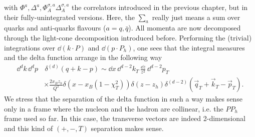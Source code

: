 with $\Phi^a, \Delta^a,\Phi_A^{\sigma,a}\Delta_A^{\sigma,a}$ the correlators introduced in the previous chapter, but in their fully-unintegrated versions. Here, the $\sum_a$ really just means a sum over quarks and anti-quarks flavours ($a=q,\bar{q}$). All momenta are now decomposed through the light-cone decomposition introduced before. Performing the (trivial) integrations over $\dd (k \cdot P)$ and $\dd (p\cdot P_h)$, one sees that the integral measures and the delta function arrange in the following way
\begin{equation}
    \begin{aligned}
        \dd^d k \,\dd^d p &\,\delta^{(d)}(q+k-p) \sim\dd x\, \dd^{d-2}k_T\, \frac{\dd z}{z^2}\, \dd^{d-2}p_T\, \\
        & \times\frac{2x_B z_h}{Q^2}\delta(x-x_B(1-\chi_T^2))\delta(z-z_h)\delta^{(d-2)}(\vec q_T+\vec k_T-\vec p_T).        
    \end{aligned}
\end{equation}
We stress that the separation of the delta function in such a way makes sense only in a frame where the nucleon and the hadron are collinear, i.e. the $PP_h$ frame used so far. In this case, the transverse vectors are indeed 2-dimensional and this kind of $(+,-,T)$ separation makes sense.

